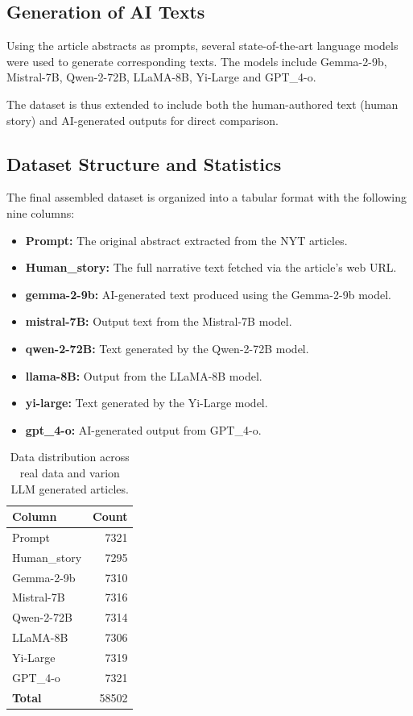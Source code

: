 \subsection{Generation of AI Texts}
Using the article abstracts as prompts, several state-of-the-art language models were used to generate corresponding texts. The models include Gemma-2-9b, Mistral-7B, Qwen-2-72B, LLaMA-8B, Yi-Large  and GPT\_4-o.

The dataset is thus extended to include both the human-authored text (human story) and AI-generated outputs for direct comparison.

\subsection{Dataset Structure and Statistics}
The final assembled dataset is organized into a tabular format with the following nine columns:
\begin{itemize}
    \item \textbf{Prompt:} The original abstract extracted from the NYT articles.
    \item \textbf{Human\_story:} The full narrative text fetched via the article’s web URL.
    \item \textbf{gemma-2-9b:} AI-generated text produced using the Gemma-2-9b model.
    \item \textbf{mistral-7B:} Output text from the Mistral-7B model.
    \item \textbf{qwen-2-72B:} Text generated by the Qwen-2-72B model.
    \item \textbf{llama-8B:} Output from the LLaMA-8B model.
    \item \textbf{yi-large:} Text generated by the Yi-Large model.
    \item \textbf{gpt\_4-o:} AI-generated output from GPT\_4-o.
\end{itemize}

\begin{table}[h]
\centering
\begin{tabular}{lr}
\hline
\textbf{Column} & \textbf{Count} \\
\hline
Prompt         & 7321 \\
Human\_story   & 7295 \\
Gemma-2-9b     & 7310 \\
Mistral-7B     & 7316 \\
Qwen-2-72B     & 7314 \\
LLaMA-8B       & 7306 \\
Yi-Large       & 7319 \\
GPT\_4-o       & 7321 \\
\hline
\textbf{Total} & 58502 \\
\hline
\end{tabular} 
\caption{Data distribution across real data and varion LLM generated articles. }
\label{tab:aggregated_counts_total}
\end{table}


